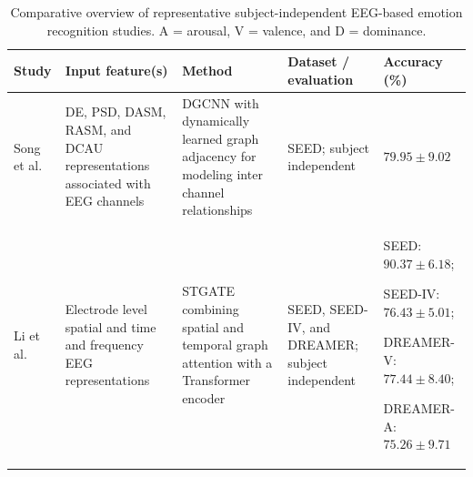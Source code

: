 \documentclass[ASNA,twocolumn]{USG}
\newcommand{\lightrowsep}{%
  \arrayrulecolor{lightrowgray}%
  \specialrule{0.30pt}{3.5pt}{3.5pt}%
  \arrayrulecolor{black}%
}
\begin{document}
\begin{table}

\centering

\caption{Comparative overview of representative subject-independent EEG-based emotion recognition studies. A = arousal, V = valence, and D = dominance.}

\label{tab:subject_independent_results}

\scriptsize

\setlength{\tabcolsep}{2.5pt}

\renewcommand{\arraystretch}{1.12}

\begin{tabularx}{\textheight}{>{\raggedright\arraybackslash}p{3.15cm}>{\raggedright\arraybackslash}X>{\raggedright\arraybackslash}X>{\raggedright\arraybackslash}p{3.45cm}>{\raggedright\arraybackslash}p{5.0cm}}

\toprule

\textbf{Study} &

\textbf{Input feature(s)} &

\textbf{Method} &

\textbf{Dataset / evaluation} &

\textbf{Accuracy (\%)} \\

\midrule

Song et al. \cite{song2018eeg} &

DE, PSD, DASM, RASM, and DCAU representations associated with EEG channels &

DGCNN with dynamically learned graph adjacency for modeling inter channel relationships &

SEED; subject independent &

$79.95 \pm 9.02$ \\

\lightrowsep

Li et al. \cite{li2023stgate} &

Electrode level spatial and time and frequency EEG representations &

STGATE combining spatial and temporal graph attention with a Transformer encoder &

SEED, SEED-IV, and DREAMER; subject independent &

SEED: $90.37 \pm 6.18$;

SEED-IV: $76.43 \pm 5.01$;

DREAMER-V: $77.44 \pm 8.40$;

DREAMER-A: $75.26 \pm 9.71$ \\


\end{tabularx}
\end{table}
\end{document}
